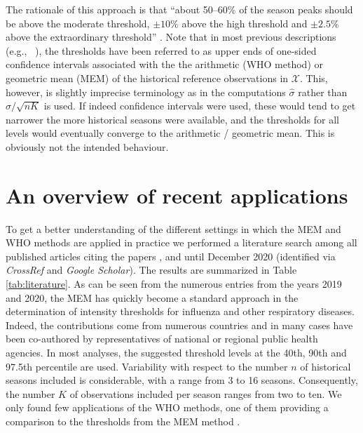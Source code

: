 \documentclass{article}
\begin{document}
\noindent The rationale of this approach is that ``about 50--60\% of the season peaks should be above the moderate threshold, $\pm 10\%$ above the high threshold and $\pm 2.5\%$ above the extraordinary threshold'' \citep{WHO2017}. Note that in most previous descriptions (e.g., \ \citealt{WHO2014, Vega2015}), the thresholds have been referred to as upper ends of one-sided confidence intervals associated with the the arithmetic (WHO method) or geometric mean (MEM) of the historical reference observations in $\mathcal{X}$. This, however, is slightly imprecise terminology as in the computations $\hat\sigma$ rather than $\hat\sigma/\sqrt{nK}$ is used. If indeed confidence intervals were used, these would tend to get narrower the more historical seasons were available, and the thresholds for all levels would eventually converge to the arithmetic / geometric mean. This is obviously not the intended behaviour.


\section{An overview of recent applications}
\label{sec:recent_applications}

To get a better understanding of the different settings in which the MEM and WHO methods are applied in practice we performed a literature search among all published articles citing the papers \cite{Vega2015}, \cite{WHO2014} and \cite{WHO2017} until December 2020 (identified via \textit{CrossRef} and \textit{Google Scholar}). The results are summarized in Table \ref{tab:literature}. As can be seen from the numerous entries from the years 2019 and 2020, the MEM has quickly become a standard approach in the determination of intensity thresholds for influenza and other respiratory diseases. Indeed, the contributions come from numerous countries and in many cases have been co-authored by representatives of national or regional public health agencies. In most analyses, the suggested threshold levels at the 40th, 90th and 97.5th percentile are used. Variability with respect to the number $n$ of historical seasons included is considerable, with a range from 3 to 16 seasons. Consequently, the number $K$ of observations included per season ranges from two to ten. We only found few applications of the WHO methods, one of them providing a comparison to the thresholds from the MEM method \citep{Rguig2020}.
\end{document}
